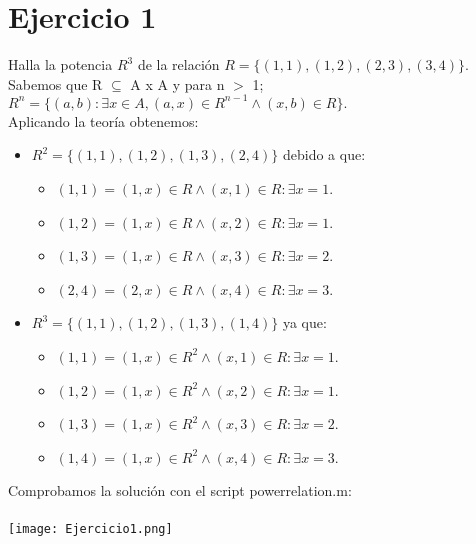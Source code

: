 \documentclass[16]{article} %
\begin{document}
\section*{Ejercicio 1}	%
\noindent %
Halla la potencia $R^{3}$ de la relación $R = \{(1,1),(1,2),(2,3),(3,4)\}$.\\
Sabemos que R $\subseteq$ A x A y para n $>$ 1; $R^{n} = \{(a,b) : \exists x \in A, (a,x) \in R^{n-1} \wedge (x,b) \in R\}.$ \\
Aplicando la teoría obtenemos:
\begin{itemize}
\item$R^{2} = \{(1,1),(1,2),(1,3),(2,4)\}$ debido a que:
	\begin{itemize}
	\item $(1,1) = (1,x) \in R \wedge (x,1) \in R : \exists x=1$.\\
	\item $(1,2) = (1,x) \in R \wedge (x,2) \in R : \exists x=1$.\\
	\item $(1,3) = (1,x) \in R \wedge (x,3) \in R : \exists x=2$.\\
	\item $(2,4) = (2,x) \in R \wedge (x,4) \in R : \exists x=3$.\\
	\end{itemize}
\item$R^{3} = \{(1,1),(1,2),(1,3),(1,4)\}$ ya que:
	\begin{itemize}
\item$(1,1) = (1,x) \in R^{2} \wedge (x,1) \in R : \exists x=1$.\\
\item$(1,2) = (1,x) \in R^{2} \wedge (x,2) \in R : \exists x=1$.\\
\item $(1,3) = (1,x) \in R^{2} \wedge (x,3) \in R : \exists x=2$.\\
\item $(1,4) = (1,x) \in R^{2} \wedge (x,4) \in R : \exists x=3$.\\
	\end{itemize}
\end{itemize}
Comprobamos la solución con el script powerrelation.m:\\\\
\texttt{[image: Ejercicio1.png]}
\end{document}
